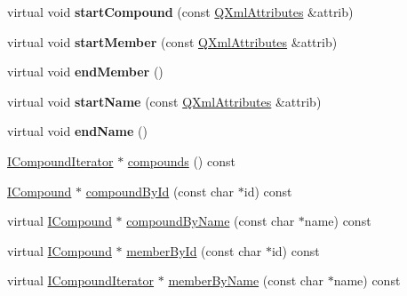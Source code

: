 \begin{DoxyCompactItemize}
\item 
\mbox{\label{class_main_handler_a812f82b37136d4c2aa5a96cbd29f8c50}} 
virtual void {\bfseries start\+Compound} (const \mbox{\hyperlink{class_q_xml_attributes}{Q\+Xml\+Attributes}} \&attrib)
\item 
\mbox{\label{class_main_handler_a5f3b574860236e5e5d157f6790ff794e}} 
virtual void {\bfseries start\+Member} (const \mbox{\hyperlink{class_q_xml_attributes}{Q\+Xml\+Attributes}} \&attrib)
\item 
\mbox{\label{class_main_handler_ad2cc00ab16466ec886ef5f54defd2194}} 
virtual void {\bfseries end\+Member} ()
\item 
\mbox{\label{class_main_handler_ab21db32d56079b731441c961cf182613}} 
virtual void {\bfseries start\+Name} (const \mbox{\hyperlink{class_q_xml_attributes}{Q\+Xml\+Attributes}} \&attrib)
\item 
\mbox{\label{class_main_handler_a6ba079fd62d9a24ec7b3ddf3be2f2d9b}} 
virtual void {\bfseries end\+Name} ()
\item 
\mbox{\hyperlink{class_i_compound_iterator}{I\+Compound\+Iterator}} $\ast$ \mbox{\hyperlink{class_main_handler_a194b44299530605b43364905f2868158}{compounds}} () const
\item 
\mbox{\hyperlink{class_i_compound}{I\+Compound}} $\ast$ \mbox{\hyperlink{class_main_handler_a126390d35459251f392ebcd1cd659cda}{compound\+By\+Id}} (const char $\ast$id) const
\item 
virtual \mbox{\hyperlink{class_i_compound}{I\+Compound}} $\ast$ \mbox{\hyperlink{class_main_handler_acd8c995e041bda4396f562da9fb44a91}{compound\+By\+Name}} (const char $\ast$name) const
\item 
virtual \mbox{\hyperlink{class_i_compound}{I\+Compound}} $\ast$ \mbox{\hyperlink{class_main_handler_a4455c328872b73a442a8e39fd81fba49}{member\+By\+Id}} (const char $\ast$id) const
\item 
virtual \mbox{\hyperlink{class_i_compound_iterator}{I\+Compound\+Iterator}} $\ast$ \mbox{\hyperlink{class_main_handler_a1fe4393d8d5c1c3d95d3a233ab80417a}{member\+By\+Name}} (const char $\ast$name) const
\item 

\end{DoxyCompactItemize}
